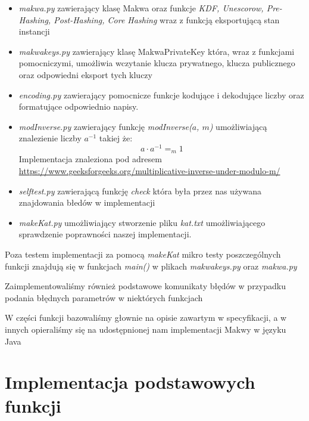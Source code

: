 \documentclass[a4paper,titleauthor]{mwart}
\begin{document}
\begin{itemize}
	\item \textit{makwa.py} zawierający klasę Makwa oraz funkcje \textit{KDF, Unescorow, Pre-Hashing, Post-Hashing, Core Hashing} wraz z funkcją eksportującą stan instancji
	\item \textit{makwakeys.py} zawierający klasę MakwaPrivateKey która, wraz z funkcjami pomocniczymi, umożliwia wczytanie klucza prywatnego, klucza publicznego oraz odpowiedni eksport tych kluczy
	\item \textit{encoding.py} zawierający pomocnicze funkcje kodujące i dekodujące liczby oraz formatujące odpowiednio napisy.
	\item \textit{modInverse.py} zawierający funkcję \textit{modInverse($a$, $m$)} umożliwiającą znalezienie liczby $a^{-1}$ takiej że: $$a\cdot a^{-1}=_m1$$
	Implementacja znaleziona pod adresem \url{https://www.geeksforgeeks.org/multiplicative-inverse-under-modulo-m/}
	\item \textit{selftest.py} zawierającą funkcję \textit{check} która była przez nas używana znajdowania błedów w implementacji
	\item \textit{makeKat.py} umożliwiający stworzenie pliku \textit{kat.txt} umożliwiającego sprawdzenie poprawności naszej implementacji.
\end{itemize}
Poza testem implementacji za pomocą \textit{makeKat} mikro testy poszczególnych funkcji znajdują się w funkcjach \textit{main()} w plikach \textit{makwakeys.py} oraz \textit{makwa.py}

Zaimplementowaliśmy również podstawowe komunikaty błędów w przypadku podania błędnych parametrów w niektórych funkcjach

W części funkcji bazowaliśmy głownie na opisie zawartym w specyfikacji, a w innych opieraliśmy się na udostępnionej nam implementacji Makwy w języku Java
\section{Implementacja podstawowych funkcji}
\end{document}

